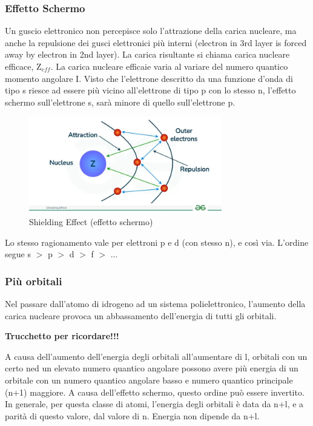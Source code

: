 \documentclass[a4paper]{article}
\begin{document}
\subsubsection{Effetto Schermo}
Un guscio elettronico non percepisce solo l'attrazione della carica nucleare, ma anche la repulsione dei gusci elettronici più interni (electron in 3rd layer is forced away by electron in 2nd layer). La carica risultante si chiama carica nucleare efficace, Z$_{eff}$. La carica nucleare efficaie varia al variare del numero quantico momento angolare I. Visto che l'elettrone descritto da una funzione d'onda di tipo s riesce ad essere più vicino all'elettrone di tipo p con lo stesso n, l'effetto schermo sull'elettrone s, sarà minore di quello sull'elettrone p. 
\begin{figure}[!ht]
    \centering
    \includegraphics[width=0.75\textwidth]{Shielding-Effect.jpg}
    \caption{Shielding Effect (effetto schermo)}
\end{figure}
\FloatBarrier
Lo stesso ragionamento vale per elettroni p e d (con stesso n), e così via. L'ordine segue s $>$ p $>$ d $>$ f $>$ ...  

\subsubsection{Più orbitali}
Nel passare dall'atomo di idrogeno ad un sistema polielettronico, l'aumento della carica nucleare provoca un abbassamento dell'energia di tutti gli orbitali. \\
\begin{center}
    \textbf{\Large{Trucchetto per ricordare!!!}}
\end{center}
A causa dell'aumento dell'energia degli orbitali all'aumentare di l, orbitali con un certo ned un elevato numero quantico angolare possono avere più energia di un orbitale con un numero quantico angolare basso e numero quantico principale (n+1) maggiore. A causa dell'effetto schermo, questo ordine può essere invertito. In generale, per questa classe di atomi, l'energia degli orbitali è data da n+l, e a parità di questo valore, dal valore di n. Energia non dipende da n+l. 
\end{document}

